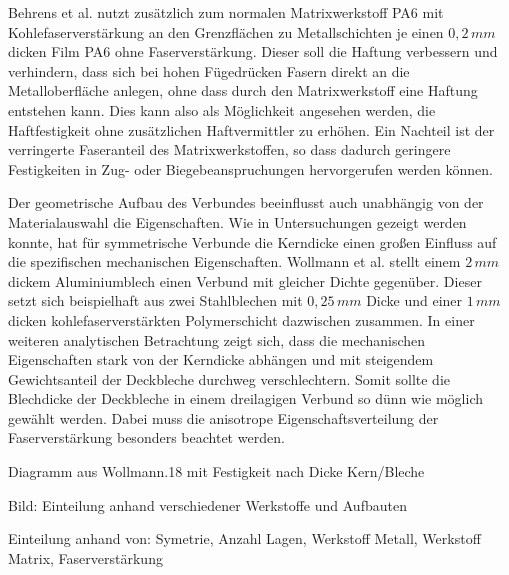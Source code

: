 Behrens et al. \cite{BerndArno.2017} nutzt zusätzlich zum normalen Matrixwerkstoff PA6 mit Kohlefaserverstärkung an den Grenzflächen zu Metallschichten je einen $0,2 \, mm$ dicken Film PA6 ohne Faserverstärkung.
Dieser soll die Haftung verbessern und verhindern, dass sich bei hohen Fügedrücken Fasern direkt an die Metalloberfläche anlegen, ohne dass durch den Matrixwerkstoff eine Haftung entstehen kann.
Dies kann also als Möglichkeit angesehen werden, die Haftfestigkeit ohne zusätzlichen Haftvermittler zu erhöhen.
Ein Nachteil ist der verringerte Faseranteil des Matrixwerkstoffen, so dass dadurch geringere Festigkeiten in Zug- oder Biegebeanspruchungen hervorgerufen werden können.


Der geometrische Aufbau des Verbundes beeinflusst auch unabhängig von der Materialauswahl die Eigenschaften.
Wie in Untersuchungen gezeigt werden konnte, hat für symmetrische Verbunde die Kerndicke einen großen Einfluss auf die spezifischen mechanischen Eigenschaften.
Wollmann et al. \cite{Wollmann.2018} stellt einem $2\,mm$ dickem Aluminiumblech einen Verbund mit gleicher Dichte gegenüber.
Dieser setzt sich beispielhaft aus zwei Stahlblechen mit $0,25\,mm$ Dicke und einer $1\,mm$ dicken kohlefaserverstärkten Polymerschicht dazwischen zusammen.
In einer weiteren analytischen Betrachtung zeigt sich, dass die mechanischen Eigenschaften stark von der Kerndicke abhängen und mit steigendem Gewichtsanteil der Deckbleche durchweg verschlechtern.
Somit sollte die Blechdicke der Deckbleche in einem dreilagigen Verbund so dünn wie möglich gewählt werden.
Dabei muss die anisotrope Eigenschaftsverteilung der Faserverstärkung besonders beachtet werden.

Diagramm aus Wollmann.18 mit Festigkeit nach Dicke Kern/Bleche






Bild: Einteilung anhand verschiedener Werkstoffe und Aufbauten


Einteilung anhand von: Symetrie, Anzahl Lagen, Werkstoff Metall, Werkstoff Matrix, Faserverstärkung









